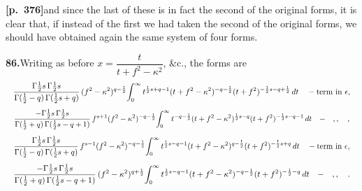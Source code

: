 \documentclass[11pt]{article}
\begin{document}
\noindent\textbf{[p.~376]}\quad and since the last of these is in fact the second of the original forms, it is clear that, if instead of the first we had taken the second of the original forms, we should have obtained again the same system of four forms.

\bigskip

\noindent\textbf{86.}\quad Writing as before $x=\dfrac{t}{t+f^{2}-\kappa^{2}}$, \&c., the forms are
\[
\resizebox{\textwidth}{!}{$\displaystyle
\frac{\Gamma\tfrac{1}{2}s\,\Gamma\tfrac{1}{2}s}{\Gamma(\tfrac{1}{2}-q)\,\Gamma(\tfrac{1}{2}s+q)}\,(f^{2}-\kappa^{2})^{q-\frac{1}{2}}\!\int_{0}^{\infty} t^{\frac{1}{2}s+q-1}(t+f^{2}-\kappa^{2})^{-q-\frac{1}{2}}(t+f^{2})^{-\frac{1}{2}s-q+\frac{1}{2}}\,dt \quad-\text{term in } \epsilon,$}
\]
\[
\resizebox{\textwidth}{!}{$\displaystyle
\frac{-\Gamma\tfrac{1}{2}s\,\Gamma\tfrac{1}{2}s}{\Gamma(\tfrac{1}{2}+q)\,\Gamma(\tfrac{1}{2}s-q+1)}\,f^{s+1}(f^{2}-\kappa^{2})^{-q-\frac{1}{2}}\!\int_{0}^{\infty} t^{-q-\frac{1}{2}}(t+f^{2}-\kappa^{2})^{\frac{1}{2}s-q}(t+f^{2})^{-\frac{1}{2}s-q-1}\,dt \quad-\quad ,, \quad,$}
\]
\[
\resizebox{\textwidth}{!}{$\displaystyle
\frac{\Gamma\tfrac{1}{2}s\,\Gamma\tfrac{1}{2}s}{\Gamma(\tfrac{1}{2}-q)\,\Gamma(\tfrac{1}{2}s+q)}\,f^{s-1}(f^{2}-\kappa^{2})^{-q-\frac{1}{2}}\!\int_{0}^{\infty} t^{\frac{1}{2}s-q-1}(t+f^{2}-\kappa^{2})^{q-\frac{1}{2}}(t+f^{2})^{-\frac{1}{2}s+q}\,dt \quad-\text{term in } \epsilon,$}
\]
\[
\resizebox{\textwidth}{!}{$\displaystyle
\frac{-\Gamma\tfrac{1}{2}s\,\Gamma\tfrac{1}{2}s}{\Gamma(\tfrac{1}{2}+q)\,\Gamma(\tfrac{1}{2}s-q+1)}\,(f^{2}-\kappa^{2})^{q+\frac{1}{2}}\!\int_{0}^{\infty} t^{\frac{1}{2}s-q-1}(t+f^{2}-\kappa^{2})^{-q-\frac{1}{2}}(t+f^{2})^{-\frac{1}{2}-q}\,dt \quad-\quad ,, \quad.$}
\]

\bigskip
\end{document}

